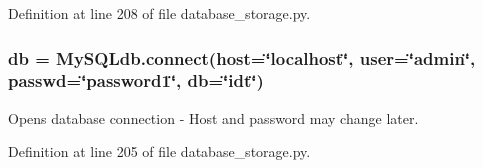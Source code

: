 Definition at line 208 of file database\+\_\+storage.\+py.

\subsubsection[{\texorpdfstring{db}{db}}]{\setlength{\rightskip}{0pt plus 5cm}db = My\+S\+Q\+Ldb.\+connect(host=\char`\"{}localhost\char`\"{}, user=\char`\"{}admin\char`\"{}, passwd=\char`\"{}password1\char`\"{}, db=\char`\"{}idt\char`\"{})}\hypertarget{namespacesrc_1_1database__storage_a89a7f6028a19c3dc081cc5f16eb53891}{}\label{namespacesrc_1_1database__storage_a89a7f6028a19c3dc081cc5f16eb53891}


Opens database connection -\/ Host and password may change later. 



Definition at line 205 of file database\+\_\+storage.\+py.

